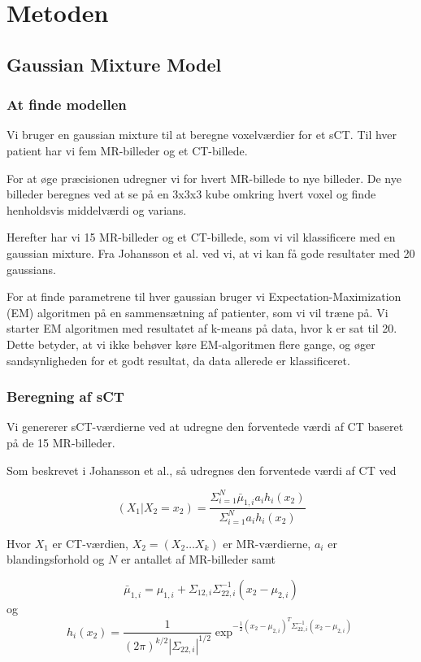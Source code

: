 \section{Metoden}
\subsection{Gaussian Mixture Model}

\subsubsection{At finde modellen}
Vi bruger en gaussian mixture til at beregne voxelværdier
for et sCT. Til hver patient har vi fem MR-billeder og et CT-billede.

For at øge præcisionen udregner vi for hvert MR-billede
to nye billeder. De nye billeder beregnes ved at se på en 3x3x3
kube omkring hvert voxel og finde henholdsvis middelværdi og varians.

Herefter har vi 15 MR-billeder og et CT-billede, som vi vil klassificere
med en gaussian mixture. Fra Johansson et al. ved vi, at vi kan få
gode resultater med 20 gaussians. 

For at finde parametrene til hver gaussian bruger vi
Expectation-Maximization (EM) algoritmen på en sammensætning af patienter, som
vi vil træne på. Vi starter EM algoritmen med resultatet af k-means på
data, hvor k er sat til 20. Dette betyder, at vi ikke behøver køre
EM-algoritmen flere gange, og øger sandsynligheden for et godt resultat, da
data allerede er klassificeret.

\subsubsection{Beregning af sCT}

Vi genererer sCT-værdierne ved at udregne den forventede værdi af CT baseret på de 15 MR-billeder. 

Som beskrevet i Johansson et al., så udregnes den forventede værdi af CT ved

\begin{equation}
(X_1 | X_2 = x_2) = \frac{\Sigma^{N}_{i=1} \bar{\mu}_{1,i} a_i h_i(x_2)}{\Sigma^{N}_{i=1} a_i h_i(x_2)}
\end{equation}

Hvor $X_1$ er CT-værdien, $X_2 = (X_2 \dots X_k)$ er MR-værdierne, $a_i$ er blandingsforhold og $N$ er antallet af MR-billeder samt

\begin{equation}
 \bar{\mu}_{1,i} = \mu_{1,i} + \Sigma_{1 2, i} \Sigma^{-1}_{22, i}(x_2 - \mu_{2,i})
\end{equation}
og
\begin{equation}
h_i(x_2)= \frac{1}{( 2 \pi )^{k/2}|\Sigma_{22,i}|^{1/2}}\exp^{-\frac{1}{2}(x_2 - \mu_{2,i})^T \Sigma^{-1}_{22, i}(x_2 - \mu_{2,i})}
\end{equation}

